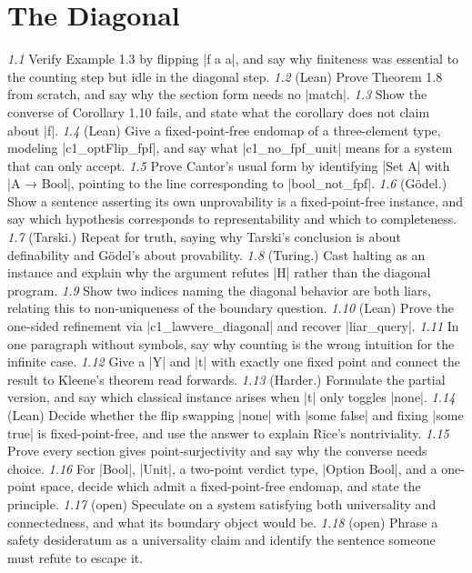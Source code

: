\documentclass{memoir}
\begin{document}
\section{The Diagonal}\label{Two--Schemas--of--Impossibility-005F-005F-005F--Machine--Checked--Limits--of--Trustworthy--Machine--Learning-005F-005F-005F--and--Why--They--Tighten--with--Capability----Exercises----The--Diagonal}

\emph{1.1} Verify Example 1.3 by flipping \LeanVerb|f a a|, and say why finiteness was essential to
the counting step but idle in the diagonal step.
\emph{1.2} (Lean) Prove Theorem 1.8 from scratch, and say why the section form needs no
\LeanVerb|match|.
\emph{1.3} Show the converse of Corollary 1.10 fails, and state what the corollary does not
claim about \LeanVerb|f|.
\emph{1.4} (Lean) Give a fixed-point-free endomap of a three-element type, modeling
\LeanVerb|c1_optFlip_fpf|, and say what \LeanVerb|c1_no_fpf_unit| means for a system that can only
accept.
\emph{1.5} Prove Cantor's usual form by identifying \LeanVerb|Set A| with \LeanVerb|A → Bool|, pointing to
the line corresponding to \LeanVerb|bool_not_fpf|.
\emph{1.6} (Gödel.) Show a sentence asserting its own unprovability is a fixed-point-free
instance, and say which hypothesis corresponds to representability and which to
completeness.
\emph{1.7} (Tarski.) Repeat for truth, saying why Tarski's conclusion is about definability
and Gödel's about provability.
\emph{1.8} (Turing.) Cast halting as an instance and explain why the argument refutes \LeanVerb|H|
rather than the diagonal program.
\emph{1.9} Show two indices naming the diagonal behavior are both liars, relating this to
non-uniqueness of the boundary question.
\emph{1.10} (Lean) Prove the one-sided refinement via \LeanVerb|c1_lawvere_diagonal| and recover
\LeanVerb|liar_query|.
\emph{1.11} In one paragraph without symbols, say why counting is the wrong intuition for
the infinite case.
\emph{1.12} Give a \LeanVerb|Y| and \LeanVerb|t| with exactly one fixed point and connect the result to
Kleene's theorem read forwards.
\emph{1.13} (Harder.) Formulate the partial version, and say which classical instance
arises when \LeanVerb|t| only toggles \LeanVerb|none|.
\emph{1.14} (Lean) Decide whether the flip swapping \LeanVerb|none| with \LeanVerb|some false| and fixing
\LeanVerb|some true| is fixed-point-free, and use the answer to explain Rice's nontriviality.
\emph{1.15} Prove every section gives point-surjectivity and say why the converse needs
choice.
\emph{1.16} For \LeanVerb|Bool|, \LeanVerb|Unit|, a two-point verdict type, \LeanVerb|Option Bool|, and a one-point
space, decide which admit a fixed-point-free endomap, and state the principle.
\emph{1.17} (open) Speculate on a system satisfying both universality and connectedness,
and what its boundary object would be.
\emph{1.18} (open) Phrase a safety desideratum as a universality claim and identify the
sentence someone must refute to escape it.
\end{document}
